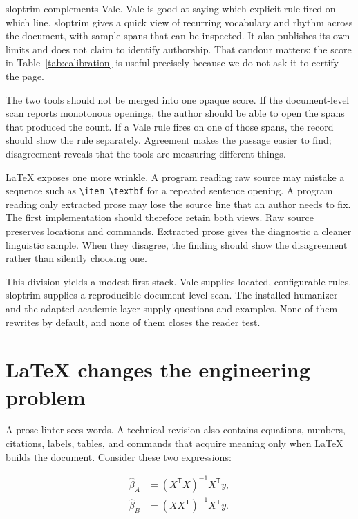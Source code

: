 sloptrim complements Vale. Vale is good at saying which explicit rule fired on
which line. sloptrim gives a quick view of recurring vocabulary and rhythm
across the document, with sample spans that can be inspected. It also publishes
its own limits and does not claim to identify authorship. That candour matters:
the score in Table~\ref{tab:calibration} is useful precisely because we do not
ask it to certify the page.

The two tools should not be merged into one opaque score. If the document-level
scan reports monotonous openings, the author should be able to open the spans
that produced the count. If a Vale rule fires on one of those spans, the record
should show the rule separately. Agreement makes the passage easier to find;
disagreement reveals that the tools are measuring different things.

LaTeX exposes one more wrinkle. A program reading raw source may mistake a
sequence such as \verb|\item \textbf| for a repeated sentence opening. A
program reading only extracted prose may lose the source line that an author
needs to fix. The first implementation should therefore retain both views. Raw
source preserves locations and commands. Extracted prose gives the diagnostic
a cleaner linguistic sample. When they disagree, the finding should show the
disagreement rather than silently choosing one.

\hvFigureDualTextViews

This division yields a modest first stack. Vale supplies located, configurable
rules. sloptrim supplies a reproducible document-level scan. The installed
humanizer and the adapted academic layer supply questions and examples. None
of them rewrites by default, and none of them closes the reader test.

\section{LaTeX changes the engineering problem}
\label{sec:oss-latex-problem}

A prose linter sees words. A technical revision also contains equations,
numbers, citations, labels, tables, and commands that acquire meaning only
when LaTeX builds the document. Consider these two expressions:

\begin{align*}
\widehat\beta_A &= (X^{\mathsf T}X)^{-1}X^{\mathsf T}y,\\
\widehat\beta_B &= (XX^{\mathsf T})^{-1}X^{\mathsf T}y.
\end{align*}

